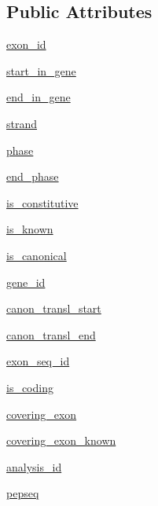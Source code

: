 \subsection*{Public Attributes}
\begin{DoxyCompactItemize}
\item 
\hyperlink{classel__utils_1_1exon_1_1Exon_acf8d6a80ce8130a38748c37a987f7f66}{exon\-\_\-id}
\item 
\hyperlink{classel__utils_1_1exon_1_1Exon_ad0f12da9fa47a6a5ca4e0056507a502e}{start\-\_\-in\-\_\-gene}
\item 
\hyperlink{classel__utils_1_1exon_1_1Exon_ae7c6a32c554cd4cc850f828d7e86e1c5}{end\-\_\-in\-\_\-gene}
\item 
\hyperlink{classel__utils_1_1exon_1_1Exon_a0967f388286f83d71863f8bb982485ce}{strand}
\item 
\hyperlink{classel__utils_1_1exon_1_1Exon_a700b1bbd77b24dc43501bd6909bc16b2}{phase}
\item 
\hyperlink{classel__utils_1_1exon_1_1Exon_aef487291c28738e020c38c068be8d63f}{end\-\_\-phase}
\item 
\hyperlink{classel__utils_1_1exon_1_1Exon_afc0c1bb526a164c2d636bb9e7d065d16}{is\-\_\-constitutive}
\item 
\hyperlink{classel__utils_1_1exon_1_1Exon_a7050059940bf2c0ddb4360367a37dcb0}{is\-\_\-known}
\item 
\hyperlink{classel__utils_1_1exon_1_1Exon_a3d388fad7ac90becc4fbf0b28c5cd4b4}{is\-\_\-canonical}
\item 
\hyperlink{classel__utils_1_1exon_1_1Exon_a07a433d0fb99f39e22c3ddaacf7d5fef}{gene\-\_\-id}
\item 
\hyperlink{classel__utils_1_1exon_1_1Exon_a04b5f50aca086a6cbeac0b5da8e315e6}{canon\-\_\-transl\-\_\-start}
\item 
\hyperlink{classel__utils_1_1exon_1_1Exon_a7f7763313b4e94cbd80314dbe33b82b6}{canon\-\_\-transl\-\_\-end}
\item 
\hyperlink{classel__utils_1_1exon_1_1Exon_ac7492cb1d0a5da7105c9a91bfd79d73b}{exon\-\_\-seq\-\_\-id}
\item 
\hyperlink{classel__utils_1_1exon_1_1Exon_aa386669ac97782cd7e32e42968107c68}{is\-\_\-coding}
\item 
\hyperlink{classel__utils_1_1exon_1_1Exon_a7750c37b6a1bcb808bf89e4be5972ffa}{covering\-\_\-exon}
\item 
\hyperlink{classel__utils_1_1exon_1_1Exon_a1b81faec7d9db09c459b4169301bebe7}{covering\-\_\-exon\-\_\-known}
\item 
\hyperlink{classel__utils_1_1exon_1_1Exon_a68f81ee35a117446697978781b632932}{analysis\-\_\-id}
\item 
\hyperlink{classel__utils_1_1exon_1_1Exon_a5fb3c326a800e425470541a893efde31}{pepseq}
\end{DoxyCompactItemize}


